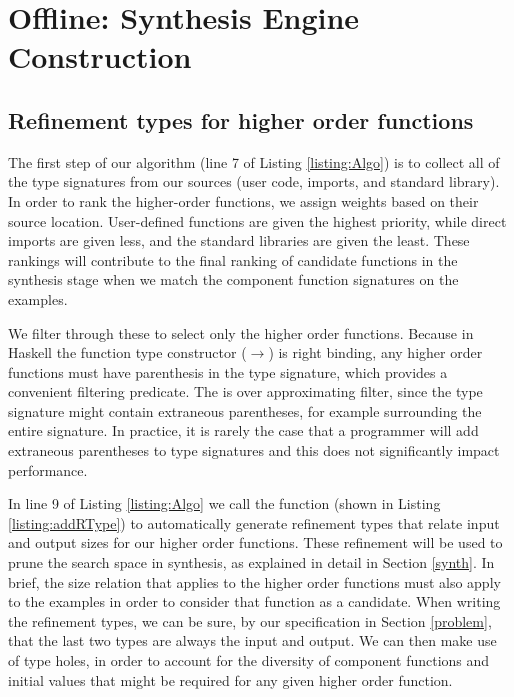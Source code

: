 \section{Offline: Synthesis Engine Construction}


\subsection{Refinement types for higher order functions}\label{HORtypeInf}

The first step of our algorithm (line 7 of Listing \ref{listing:Algo}) is to collect all of the type signatures from our sources (user code, imports, and standard library). In order to rank the higher-order functions, we assign weights based on their source location. User-defined functions are given the highest priority, while direct imports are given less, and the standard libraries are given the least. These rankings will contribute to the final ranking of candidate functions in the synthesis stage when we match the component function signatures on the examples.

We filter through these to select only the higher order functions. Because in Haskell the function type constructor ($\to$) is right binding, any higher order functions must have parenthesis in the type signature, which provides a convenient filtering predicate. The is over approximating filter, since the type signature might contain extraneous parentheses, for example surrounding the entire signature. In practice, it is rarely the case that a programmer will add extraneous parentheses to type signatures and this does not significantly impact performance.

In line 9 of Listing \ref{listing:Algo} we call the  function (shown in Listing \ref{listing:addRType}) to automatically generate refinement types that relate input and output sizes for our higher order functions.
These refinement will be used to prune the search space in synthesis, as explained in detail in Section \ref{synth}.
In brief, the size relation that applies to the higher order functions must also apply to the examples in order to consider that function as a candidate.
When writing the refinement types, we can be sure, by our specification in Section \ref{problem}, that the last two types are always the input and output.
We can then make use of type holes, in order to account for the diversity of component functions and initial values that might be required for any given higher order function.

